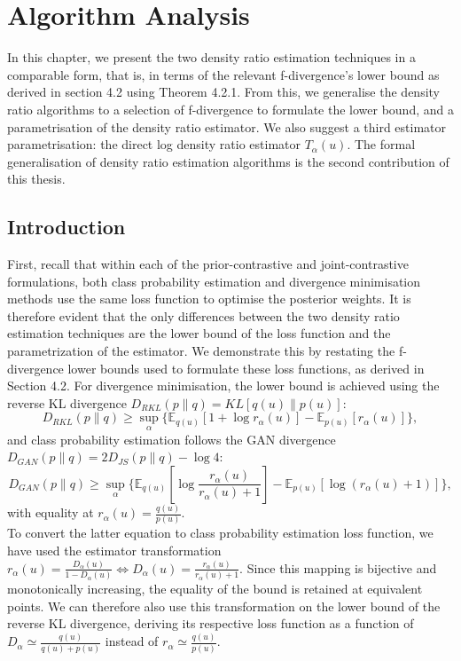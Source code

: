 \documentclass[honours,12pt]{unswthesis}
\numberwithin{equation}{section}
\theoremstyle{definition}
\begin{document}
\chapter{Algorithm Analysis}
In this chapter, we present the two density ratio estimation techniques in a comparable form, that is, in terms of the relevant f-divergence's lower bound as derived in section 4.2 using Theorem 4.2.1. From this, we generalise the density ratio algorithms to a selection of f-divergence to formulate the lower bound, and a parametrisation of the density ratio estimator. We also suggest a third estimator parametrisation: the direct log density ratio estimator $T_\alpha(u)$. The formal generalisation of density ratio estimation algorithms is the second contribution of this thesis.
\section{Introduction}
First, recall that within each of the prior-contrastive and joint-contrastive formulations, both class probability estimation and divergence minimisation methods use the same loss function to optimise the posterior weights. It is therefore evident that the only differences between the two density ratio estimation techniques are the lower bound of the loss function and the parametrization of the estimator. We demonstrate this by restating the f-divergence lower bounds used to formulate these loss functions, as derived in Section 4.2. For divergence minimisation, the lower bound is achieved using the reverse KL divergence $D_{RKL}(p\|q)=KL[q(u)\|p(u)]$:
\[D_{RKL}(p\|q)\geq \sup_{\alpha}\{\mathbb{E}_{q(u)}[1+\log r_\alpha(u)]-\mathbb{E}_{p(u)}[r_\alpha(u)]\},\]
and class probability estimation follows the GAN divergence $D_{GAN}(p\|q)=2D_{JS}(p\|q)-\log 4$:
\[D_{GAN}(p\|q)\geq \sup_\alpha\{\mathbb{E}_{q(u)}\left[\log \frac{r_\alpha(u)}{r_\alpha(u)+1}\right]-\mathbb{E}_{p(u)}[\log(r_\alpha(u)+1)]\},\]
with equality at $r_\alpha(u)=\frac{q(u)}{p(u)}$.\\
To convert the latter equation to class probability estimation loss function, we have used the estimator transformation $r_\alpha(u)=\frac{D_\alpha(u)}{1-D_\alpha(u)}\iff D_\alpha(u)=\frac{r_\alpha(u)}{r_\alpha(u)+1}$. Since this mapping is bijective and monotonically increasing, the equality of the bound is retained at equivalent points. We can therefore also use this transformation on the lower bound of the reverse KL divergence, deriving its respective loss function as a function of $D_\alpha\simeq \frac{q(u)}{q(u)+p(u)}$ instead of $r_\alpha\simeq \frac{q(u)}{p(u)}$.
\end{document}
